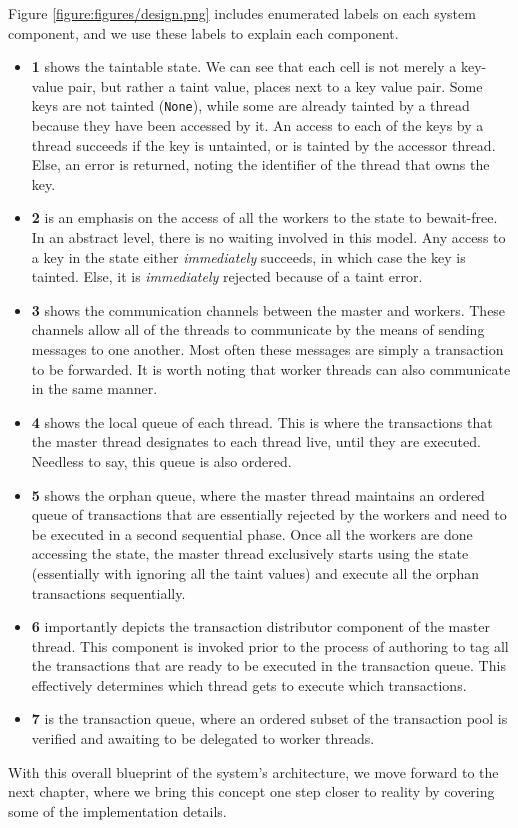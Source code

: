 
Figure \ref{figure:figures/design.png} includes enumerated labels on each system component, and we
use these labels to explain each component.

\begin{itemize}
	\item \textbf{1} shows the taintable state. We can see that each cell is not merely a key-value
	pair, but rather a taint value, places next to a key value pair. Some keys are not tainted
	(\texttt{None}), while some are already tainted by a thread because they have been accessed by
	it. An access to each of the keys by a thread succeeds if the key is untainted, or is
	tainted by the accessor thread. Else, an error is returned, noting the identifier of the thread
	that owns the key.
	\item \textbf{2} is an emphasis on the access of all the workers to the state to bewait-free. In an abstract
	level, there is no waiting involved in this model. Any access to a key in the state either
	\textit{immediately} succeeds, in which case the key is tainted. Else, it is
	\textit{immediately} rejected because of a taint error.
	\item \textbf{3} shows the communication channels between the master and workers. These channels
	allow all of the threads to communicate by the means of sending messages to one another. Most
	often these messages are simply a transaction to be forwarded. It is worth noting that worker
	threads can also communicate in the same manner.
	\item \textbf{4} shows the local queue of each thread. This is where the transactions that the
	master thread designates to each thread live, until they are executed. Needless to say, this
	queue is also ordered.
	\item \textbf{5} shows the orphan queue, where the master thread maintains an ordered queue of
	transactions that are essentially rejected by the workers and need to be executed in a second
	sequential phase. Once all the workers are done accessing the state, the master thread
	exclusively starts using the state (essentially with ignoring all the taint values) and execute
	all the orphan transactions sequentially.
	\item \textbf{6} importantly depicts the transaction distributor component of the master thread.
	This component is invoked prior to the process of authoring to tag all the transactions that are
	ready to be executed in the transaction queue. This effectively determines which thread gets to
	execute which transactions.
	\item \textbf{7} is the transaction queue, where an ordered subset of the transaction pool is
	verified and awaiting to be delegated to worker threads.
\end{itemize}

With this overall blueprint of the system's architecture, we move forward to the next chapter, where
we bring this concept one step closer to reality by covering some of the implementation
details.






